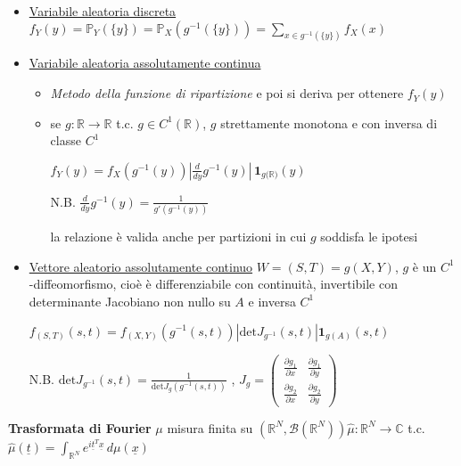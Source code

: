 \documentclass[openany]{book} %
\begin{document}
\begin{itemize}

\item \underline{Variabile aleatoria discreta} $f_Y(y)=\mathbb{P}_Y(\{y\})=\mathbb{P}_X(g^{-1}(\{y\}))=\sum_{x\in g^{-1}(\{y\})}f_X(x)$
 
\item \underline{Variabile aleatoria assolutamente continua} 

\begin{itemize}

\item \textit{Metodo della funzione di ripartizione} e poi si deriva per ottenere $f_Y(y)$

\item se $g:\mathbb{R}\rightarrow \mathbb{R}$ t.c. $g\in C^1(\mathbb{R})$, $g$ strettamente monotona e con inversa di classe $C^1$

$f_Y(y)=f_X(g^{-1}(y))|\frac{d}{dy}g^{-1}(y)|\,\boldsymbol{1}_{g(\mathbb{R)}}(y)$

N.B. $\frac{d}{dy}g^{-1}(y) = \frac{1}{g'(g^{-1}(y))}$

la relazione è valida anche per partizioni in cui $g$ soddisfa le ipotesi

\end{itemize}

\item \underline{Vettore aleatorio assolutamente continuo} $W = (S,T) = g(X,Y)$, $g$ è un $C^1$-diffeomorfismo, cioè è differenziabile con continuità, invertibile con determinante Jacobiano non nullo su $A$ e inversa $C^1$

$f_{(S,T)}(s,t)=f_{(X,Y)}(g^{-1}(s,t))\left|\text{det} J_{g^{-1}}(s,t)\right|\boldsymbol{1}_{g(A)}(s,t)$

N.B. $\text{det}J_{g^{-1}}(s,t)=\frac{1}{\text{det}J_g(g^{-1}(s,t))}$ , $J_g=\left(\begin{array}{cc}\frac{\partial g_1}{\partial x} & \frac{\partial g_1}{\partial y} \\ \frac{\partial g_2}{\partial x} & \frac{\partial g_2}{\partial y} \end{array}\right)$

\end{itemize}

\textbf{Trasformata di Fourier} $\mu$ misura finita su $(\mathbb{R}^N, \mathcal{B}(\mathbb{R}^N))$\quad $\hat {\mu}:\mathbb{R}^N\rightarrow \mathbb{C}$ t.c. $\hat {\mu}(\underline{t})=\int_{\mathbb{R}^N}e^{i \underline{t}^T \underline{x}}\,d\mu(\underline{x})$
\end{document}
